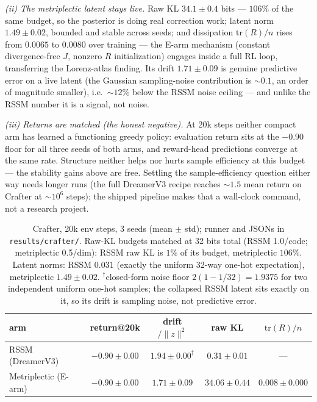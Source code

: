 \documentclass[preprint,12pt]{article}
\begin{document}
\emph{(ii) The metriplectic latent stays live.} Raw KL $34.1\pm0.4$
bits --- $106\%$ of the same budget, so the posterior is doing real
correction work; latent norm $1.49\pm0.02$, bounded and stable across
seeds; and dissipation $\mathrm{tr}(R)/n$ rises from $0.0065$ to $0.0080$
over training --- the E-arm mechanism (constant divergence-free $J$,
nonzero $R$ initialization) engages inside a full RL loop, transferring
the Lorenz-atlas finding. Its drift $1.71\pm0.09$ is genuine predictive
error on a live latent (the Gaussian sampling-noise contribution is
$\sim0.1$, an order of magnitude smaller), i.e.~$\sim12\%$ below the
RSSM noise ceiling --- and unlike the RSSM number it is a signal, not
noise.

\emph{(iii) Returns are matched (the honest negative).} At 20k steps
neither compact arm has learned a functioning greedy policy: evaluation
return sits at the $-0.90$ floor for all three seeds of both arms, and
reward-head predictions converge at the same rate. Structure neither
helps nor hurts sample efficiency at this budget --- the stability gains
above are free. Settling the sample-efficiency question either way needs
longer runs (the full DreamerV3 recipe reaches $\sim1.5$ mean return on
Crafter at $\sim10^6$ steps); the shipped pipeline makes that a
wall-clock command, not a research project.\begin{table}[t]
\centering
\small
\begin{tabular}{lcccc}
\toprule
arm & return@20k & drift$/\|z\|^2$ & raw KL & $\mathrm{tr}(R)/n$ \\
\midrule
RSSM (DreamerV3) & $-0.90\pm0.00$ & $1.94\pm0.00^{\dagger}$ &
$0.31\pm0.01$ & --- \\
Metriplectic (E-arm) & $-0.90\pm0.00$ & $1.71\pm0.09$ &
$34.06\pm0.44$ & $0.008\pm0.000$ \\
\bottomrule
\end{tabular}
\caption{Crafter, 20k env steps, 3 seeds (mean $\pm$ std); runner and
JSONs in \texttt{results/crafter/}. Raw-KL budgets matched at 32 bits
total (RSSM 1.0/code; metriplectic 0.5/dim): RSSM raw KL is $1\%$ of its
budget, metriplectic $106\%$. Latent norms: RSSM $0.031$ (exactly the
uniform 32-way one-hot expectation), metriplectic $1.49\pm0.02$.
$^{\dagger}$closed-form noise floor $2(1-1/32)=1.9375$ for two
independent uniform one-hot samples; the collapsed RSSM latent sits
exactly on it, so its drift is sampling noise, not predictive error.}
\label{tab:crafter}
\end{table}
\end{document}

